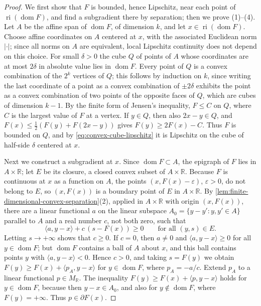 \begin{proof}
We first show that $F$ is bounded, hence Lipschitz, near each point of $\operatorname{ri}(\operatorname{dom}F)$, and find a subgradient there by separation; then we prove (1)--(4). Let $A$ be the affine span of $\operatorname{dom}F$, of dimension $k$, and let $x\in\operatorname{ri}(\operatorname{dom}F)$. Choose affine coordinates on $A$ centered at $x$, with the associated Euclidean norm $|\cdot|$; since all norms on $A$ are equivalent, local Lipschitz continuity does not depend on this choice. For small $\delta>0$ the cube $Q$ of points of $A$ whose coordinates are at most $2\delta$ in absolute value lies in $\operatorname{dom}F$. Every point of $Q$ is a convex combination of the $2^k$ vertices of $Q$; this follows by induction on $k$, since writing the last coordinate of a point as a convex combination of $\pm2\delta$ exhibits the point as a convex combination of two points of the opposite faces of $Q$, which are cubes of dimension $k-1$. By the finite form of Jensen's inequality, $F\leq C$ on $Q$, where $C$ is the largest value of $F$ at a vertex. If $y\in Q$, then also $2x-y\in Q$, and $F(x)\leq\frac12(F(y)+F(2x-y))$ gives $F(y)\geq2F(x)-C$. Thus $F$ is bounded on $Q$, and by \eqref{eq:convex-cube-lipschitz} it is Lipschitz on the cube of half-side $\delta$ centered at $x$.

Next we construct a subgradient at $x$. Since $\operatorname{dom}F\subset A$, the epigraph of $F$ lies in $A\times\mathbb R$; let $E$ be its closure, a closed convex subset of $A\times\mathbb R$. Because $F$ is continuous at $x$ as a function on $A$, the points $(x,F(x)-\varepsilon)$, $\varepsilon>0$, do not belong to $E$, so $(x,F(x))$ is a boundary point of $E$ in $A\times\mathbb R$. By \cref{lem:finite-dimensional-convex-separation}(2), applied in $A\times\mathbb R$ with origin $(x,F(x))$, there are a linear functional $a$ on the linear subspace $A_0=\{y-y':y,y'\in A\}$ parallel to $A$ and a real number $c$, not both zero, such that
\[
 \langle a,y-x\rangle+c\,(s-F(x))\geq0\qquad\text{for all }(y,s)\in E.
\]
Letting $s\to+\infty$ shows that $c\geq0$. If $c=0$, then $a\neq0$ and $\langle a,y-x\rangle\geq0$ for all $y\in\operatorname{dom}F$; but $\operatorname{dom}F$ contains a ball of $A$ about $x$, and this ball contains points $y$ with $\langle a,y-x\rangle<0$. Hence $c>0$, and taking $s=F(y)$ we obtain $F(y)\geq F(x)+\langle p_A,y-x\rangle$ for $y\in\operatorname{dom}F$, where $p_A=-a/c$. Extend $p_A$ to a linear functional $p\in M_{\mathbb R}$. The inequality $F(y)\geq F(x)+\langle p,y-x\rangle$ holds for $y\in\operatorname{dom}F$, because then $y-x\in A_0$, and also for $y\notin\operatorname{dom}F$, where $F(y)=+\infty$. Thus $p\in\partial F(x)$.


\end{proof}
